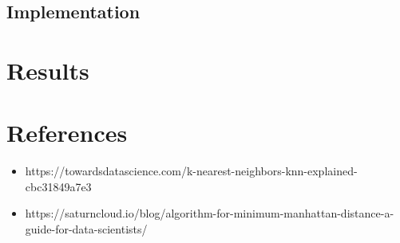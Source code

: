 \documentclass[letterpaper, 12pt]{article}
\begin{document}
        \subsection*{Implementation}
            \par 
    \section*{Results}    %
    \section*{References}
    \begin{itemize}
        \item https://towardsdatascience.com/k-nearest-neighbors-knn-explained-cbc31849a7e3
        \item https://saturncloud.io/blog/algorithm-for-minimum-manhattan-distance-a-guide-for-data-scientists/
    \end{itemize}
\end{document}
